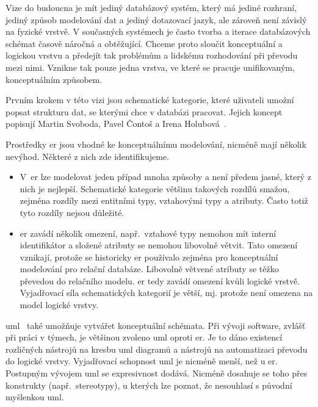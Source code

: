 Vize do budoucna je mít jediný databázový systém, který má jediné rozhraní, jediný způsob modelování dat a jediný dotazovací jazyk, ale zároveň není závislý na fyzické vrstvě.
V současných systémech je často tvorba a iterace databázových schémat časově náročná a obtěžující.
Chceme proto sloučit konceptuální a logickou vrstvu a předejít tak problémům a lidskému rozhodování při převodu mezi nimi.
Vznikne tak pouze jedna vrstva, ve které se pracuje unifikovaným, konceptuálním způsobem.

Prvním krokem v této vizi jsou schematické kategorie, které uživateli umožní popsat strukturu dat, se kterými chce v databázi pracovat.
Jejich koncept popisují Martin Svoboda, Pavel Čontoš a Irena Holubová~\cite{svoboda_categorical_2021}.

Prostředky \acrshort{er} jsou vhodné ke konceptuálnímu modelování, nicméně mají několik nevýhod.
Některé z nich zde identifikujeme.
\begin{itemize}
  \item V~\acrshort{er} lze modelovat jeden případ mnoha způsoby a není předem jasné, který z nich je nejlepší.
        Schematické kategorie většinu takových rozdílů smažou, zejména rozdíly mezi entitními typy, vztahovými typy a atributy.
        Často totiž tyto rozdíly nejsou důležité.
  \item \acrshort{er} zavádí několik omezení, např.~vztahové typy nemohou mít interní identifikátor a složené atributy se nemohou libovolně větvit.
        Tato omezení vznikají, protože se historicky \acrshort{er} používalo zejména pro konceptuální modelování pro relační databáze.
        Libovolně větvené atributy se těžko převedou do relačního modelu.
        \acrshort{er} tedy zavádí omezení kvůli logické vrstvě.
        Vyjadřovací síla schematických kategorií je větší, mj. protože není omezena na model logické vrstvy.
\end{itemize}

\acrfull{uml}~\cite{omg_uml_2017} také umožňuje vytvářet konceptuální schémata.
Při vývoji software, zvlášť při práci v týmech, je většinou zvoleno \acrshort{uml} oproti \acrshort{er}.
Je to dáno existencí rozličných nástrojů na kresbu \acrshort{uml} diagramů a nástrojů na automatizaci převodu do logické vrstvy.
Vyjadřovací schopnost \acrshort{uml} je nicméně menší, než u \acrshort{er}.
Postupným vývojem \acrshort{uml} se expresivnost dodává.
Nicméně dosahuje se toho přes konstrukty (např.~stereotypy), u kterých lze poznat, že nesouhlasí s původní myšlenkou \acrshort{uml}.

